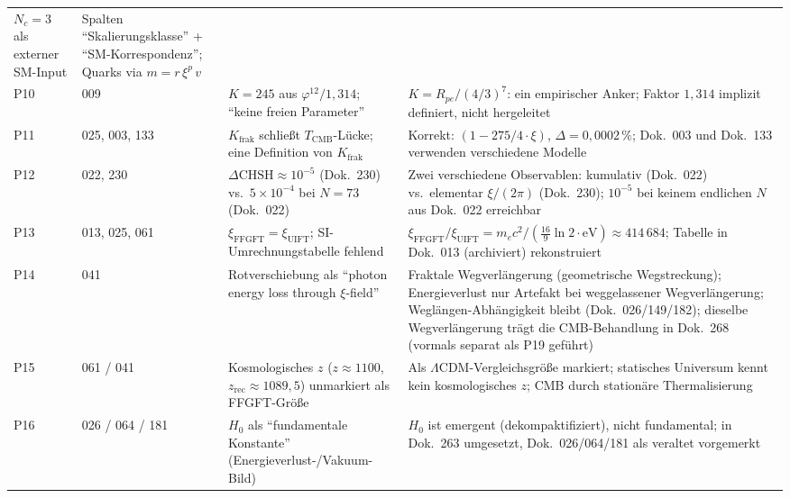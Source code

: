 {\begin{longtable}{p{0.6cm}p{2.4cm}p{5.5cm}p{5.5cm}}
  $N_c = 3$ als externer SM-Input &
  Spalten \enquote{Skalierungs\-klasse} + \enquote{SM-Korrespondenz}; \newline
  Quarks via $m = r\,\xi^p\,v$ \\[3pt]
P10 & 009 &
  $K = 245$ aus $\varphi^{12}/1{,}314$; \newline
  \enquote{keine freien Parameter} &
  $K = R_{pe}/(4/3)^7$: ein empirischer Anker; \newline
  Faktor $1{,}314$ implizit definiert, nicht hergeleitet \\[3pt]
P11 & 025, 003, 133 &
  $K_\text{frak}$ schließt $T_\text{CMB}$-Lücke; \newline
  eine Definition von $K_\text{frak}$ &
  Korrekt: $(1-275/4\cdot\xi)$, $\Delta=0{,}0002\,\%$; \newline
  Dok.~003 und Dok.~133 verwenden verschiedene Modelle \\[3pt]
P12 & 022, 230 &
  $\Delta\text{CHSH} \approx 10^{-5}$ (Dok.~230) vs.\
  $5\times10^{-4}$ bei $N=73$ (Dok.~022) &
  Zwei verschiedene Observablen: kumulativ (Dok.~022) vs.\ elementar $\xi/(2\pi)$ (Dok.~230);
  $10^{-5}$ bei keinem endlichen $N$ aus Dok.~022 erreichbar \\[3pt]
P13 & 013, 025, 061 &
  $\xi_\text{FFGFT} = \xi_\text{UIFT}$; \newline
  SI-Umrechnungstabelle fehlend &
  $\xi_\text{FFGFT}/\xi_\text{UIFT} = m_ec^2/(\frac{16}{9}\ln 2\cdot\text{eV}) \approx 414\,684$; \newline
  Tabelle in Dok.~013 (archiviert) rekonstruiert \\[3pt]
P14 & 041 &
  Rotverschiebung als \enquote{photon energy loss through $\xi$-field} &
  Fraktale Wegverlängerung (geometrische Wegstreckung); Energieverlust nur Artefakt bei weggelassener Wegverlängerung; Weglängen-Abhängigkeit bleibt (Dok.~026/149/182); dieselbe Wegverlängerung trägt die CMB-Behandlung in Dok.~268 (vormals separat als P19 geführt) \\[3pt]
P15 & 061 / 041 &
  Kosmologisches $z$ ($z\approx 1100$, $z_{\text{rec}}\approx 1089{,}5$) unmarkiert als FFGFT-Größe &
  Als $\Lambda$CDM-Vergleichsgröße markiert; statisches Universum kennt kein kosmologisches $z$; CMB durch stationäre Thermalisierung \\[3pt]
P16 & 026 / 064 / 181 &
  $H_0$ als \enquote{fundamentale Konstante} (Energieverlust-/Vakuum-Bild) &
  $H_0$ ist emergent (dekompaktifiziert), nicht fundamental; in Dok.~263 umgesetzt, Dok.~026/064/181 als veraltet vorgemerkt \\[3pt]

\end{longtable}}
